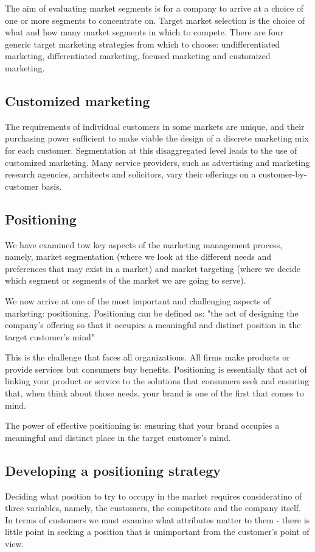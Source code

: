 \documentclass{article}
\begin{document}
The aim of evaluating market segments is for a company to arrive at a choice of one or more segments to concentrate on. Target market selection is the choice of what and how many market segments in which to compete. There are four generic target marketing strategies from which to choose: undifferentiated marketing, differentiated marketing, focused marketing and customized marketing. 

\subsection{Customized marketing}
The requirements of individual customers in some markets are unique, and their purchasing power sufficient to make viable the design of a discrete marketing mix for each customer. Segmentation at this disaggregated level leads to the use of customized marketing. Many service providers, such as advertising and marketing research agencies, architects and solicitors, vary their offerings on a customer-by-customer basis.

\subsection{Positioning}
We have examined tow key aspects of the marketing management process, namely, market segmentation (where we look at the different needs and preferences that may exist in a market) and market targeting (where we decide which segment or segments of the market we are going to serve).

We now arrive at one of the most important and challenging aspects of marketing: positioning. Positioning can be defined as: "the act of designing the company's offering so that it occupies a meaningful and distinct position in the target customer's mind"

This is the challenge that faces all organizations. All firms make products or provide services but consumers buy benefits. Positioning is essentially that act of linking your product or service to the solutions that consumers seek and ensuring that, when think about those needs, your brand is one of the first that comes to mind. 

The power of effective positioning is: ensuring that your brand occupies a meaningful and distinct place in the target customer's mind.

\subsection{Developing a positioning strategy}
Deciding what position to try to occupy in the market requires consideratino of three variables, namely, the customers, the competitors and the company itself. In terms of customers we must examine what attributes matter to them - there is little point in seeking a position that is unimportant from the customer's point of view. 
\end{document}
